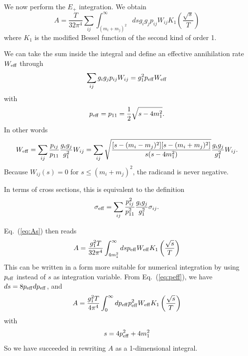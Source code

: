 \documentclass[a4paper,10pt,oneside]{book}
\begin{document}
We now perform the $E_{+}$ integration. We obtain
\begin{equation}
\label{eq:As}
  A = \frac{T}{32 \pi^4} \sum_{ij} \int_{(m_i+m_j)^2}^\infty ds
  g_ig_jp_{ij} W_{ij} K_{1} \left( \frac{\sqrt{s}}{T}\right)
\end{equation}
where $K_{1}$ is the modified Bessel function of the second kind of 
order 1.

We can take the sum inside the integral and define an effective
annihilation rate $W_{\rm eff}$ through
\begin{equation}
  \sum_{ij} g_i g_j p_{ij} W_{ij} = g_1^2 p_{\rm{eff}} W_{\rm{eff}}
\end{equation}
with
\begin{equation}
\label{eq:peff}
  p_{\rm{eff}} = p_{11} = \frac{1}{2} \sqrt{s-4m_{1}^2} .
\end{equation}
In other words
\begin{equation} \label{eq:weff}
  W_{\rm{eff}} = \sum_{ij}\frac{p_{ij}}{p_{11}}
  \frac{g_ig_j}{g_1^2} W_{ij} = 
  \sum_{ij} \sqrt{\frac{[s-(m_{i}-m_{j})^2][s-(m_{i}+m_{j})^2]}
  {s(s-4m_1^2)}} \frac{g_ig_j}{g_1^2} W_{ij}.
\end{equation}
Because $W_{ij}(s) = 0 $ for $s \le (m_i+m_j)^2$, the radicand is  
never negative.

In terms of cross sections, this is equivalent to the definition
\begin{equation}
\sigma_{\rm eff} = \sum_{ij} \frac{p^2_{ij}}{p^2_{11}}
  \frac{g_ig_j}{g_1^2} \sigma_{ij}.
\end{equation}  

Eq.~(\ref{eq:As}) then reads
\begin{equation}
  A = \frac{g_1^2 T}{32 \pi^4} \int_{4m_1^2}^\infty ds
  p_{\rm eff} W_{\rm eff} K_{1} \left( \frac{\sqrt{s}}{T}\right)
\end{equation}
This can be written in a form more suitable
for numerical integration by using $p_{\rm{eff}}$ instead of $s$ as
integration variable.  From Eq.~(\ref{eq:peff}), we have 
 $ ds = 8 p_{\rm{eff}} dp_{\rm{eff}} $, and 
\begin{equation}
\label{eq:Apeff}
  A = \frac{g_1^2 T}{4 \pi^4} \int_{0}^\infty dp_{\rm eff}
  p^2_{\rm eff} W_{\rm eff} K_{1} 
  \left( \frac{\sqrt{s}}{T}\right)
\end{equation}
with
\begin{equation}
  s = 4p_{\rm{eff}}^2 + 4m_1^2
\end{equation}
So we have succeeded in rewriting $A$ as a 1-dimensional integral.
\end{document}
